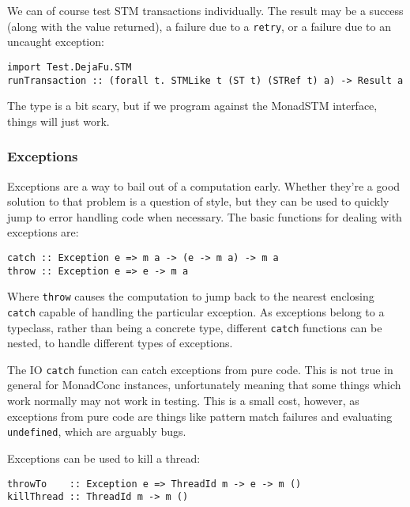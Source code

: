 We can of course test STM transactions individually. The result may be
a success (along with the value returned), a failure due to a
\texttt{retry}, or a failure due to an uncaught exception:

\begin{verbatim}
import Test.DejaFu.STM
runTransaction :: (forall t. STMLike t (ST t) (STRef t) a) -> Result a
\end{verbatim}

The type is a bit scary, but if we program against the MonadSTM
interface, things will just work.

\subsubsection*{Exceptions}
\label{sec:prelims-dejafu-conc-excs}

Exceptions are a way to bail out of a computation early. Whether
they're a good solution to that problem is a question of style, but
they can be used to quickly jump to error handling code when
necessary. The basic functions for dealing with exceptions are:

\begin{verbatim}
catch :: Exception e => m a -> (e -> m a) -> m a
throw :: Exception e => e -> m a
\end{verbatim}

Where \texttt{throw} causes the computation to jump back to the
nearest enclosing \texttt{catch} capable of handling the particular
exception. As exceptions belong to a typeclass, rather than being a
concrete type, different \texttt{catch} functions can be nested, to
handle different types of exceptions.

\begin{departure}
  The IO \texttt{catch} function can catch exceptions from pure
  code. This is not true in general for MonadConc instances,
  unfortunately meaning that some things which work normally may not
  work in testing. This is a small cost, however, as exceptions from
  pure code are things like pattern match failures and evaluating
  \texttt{undefined}, which are arguably bugs.
\end{departure}

Exceptions can be used to kill a thread:

\begin{verbatim}
throwTo    :: Exception e => ThreadId m -> e -> m ()
killThread :: ThreadId m -> m ()
\end{verbatim}

